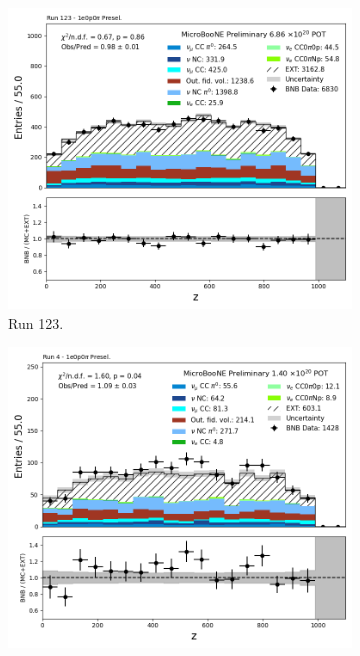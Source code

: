 \begin{figure}[H]
    \centering
    \begin{subfigure}[t]{0.32\linewidth}
        \includegraphics[width=\linewidth]{technote/Appendix_Preselection/Figures/1e0p0pi/Run123/reco_nu_vtx_z_Run123_1e0p0pi_Presel.png}
        \caption{Run 123.}
    \end{subfigure}%
    \hspace{0.2cm}%
    \begin{subfigure}[t]{0.32\linewidth}
        \includegraphics[width=\linewidth]{technote/Appendix_Preselection/Figures/1e0p0pi/Run4b/reco_nu_vtx_z_Run4b_1e0p0pi_Presel.png}

\end{subfigure}
\end{figure}
